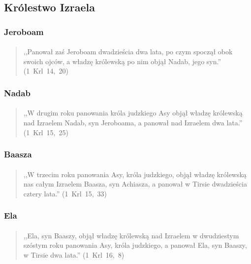 \documentclass[10pt,a4paper,oneside]{article}
\begin{document}
\subsection{Królestwo Izraela}
\subsubsection{Jeroboam}
\paragraph{}
\begin{quote}
,,Panował zaś Jeroboam dwadzieścia dwa lata, po czym spoczął obok swoich ojców, a władzę królewską po nim objął Nadab, jego syn.'' \mbox{(1 Krl 14, 20)}
\end{quote}
\subsubsection{Nadab}
\paragraph{}
\begin{quote}
,,W drugim roku panowania króla judzkiego Asy objął władzę królewską nad Izraelem Nadab, syn Jeroboama, a panował nad Izraelem dwa lata.'' \mbox{(1 Krl 15, 25)}
\end{quote}
\subsubsection{Baasza}
\paragraph{}
\begin{quote}
,,W trzecim roku panowania Asy, króla judzkiego, objął władzę królewską nas całym Izraelem Baasza, syn Achiasza, a panował w Tirsie dwadzieścia cztery lata.'' \mbox{(1 Krl 15, 33)}
\end{quote}
\subsubsection{Ela}
\paragraph{}
\begin{quote}
,,Ela, syn Baaszy, objął władzę królewską nad Izraelem w dwudziestym szóstym roku panowania Asy, króla judzkiego, a panował Ela, syn Baaszy, w Tirsie dwa lata.'' \mbox{(1 Krl 16, 8)}
\end{quote}
\end{document}
